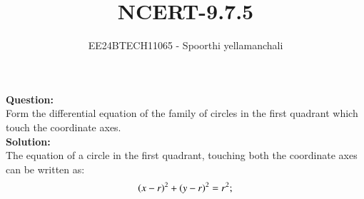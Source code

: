 \documentclass[journal]{IEEEtran}
\begin{document}

\vspace{3cm}

\title{NCERT-9.7.5}
\author{EE24BTECH11065 - Spoorthi yellamanchali
}
{\let\newpage\relax\maketitle}

\renewcommand{\thefigure}{\theenumi}
\renewcommand{\thetable}{\theenumi}
\setlength{\intextsep}{10pt} %


\renewcommand{\thetable}{\theenumi}


\textbf{Question:}
\\
Form the differential equation of the family of circles in the first quadrant which touch the coordinate axes.
\\
\textbf{Solution: }
\\
The equation of a circle in the first quadrant, touching both the coordinate axes can be written as:
\begin{align}
    {\ensuremath{\left(x - r\right)}}^2 + {\left(y - r\right)}^2 = r^2;
\end{align}
\end{document}
